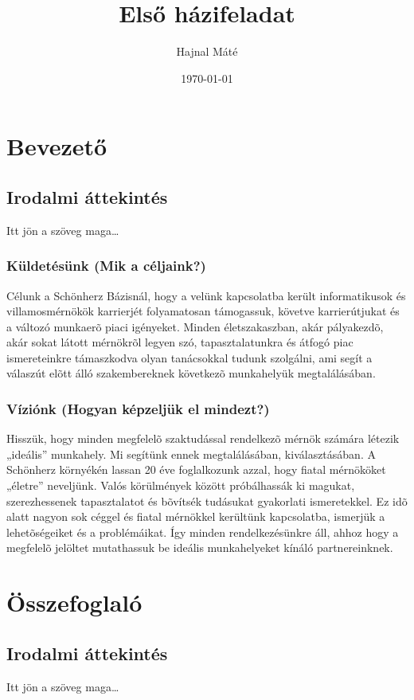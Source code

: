 \documentclass[12pt,a4paper]{report}	%
\begin{document}
\title{Első házifeladat}
\author{Hajnal Máté}
\date{\today}

\maketitle

\tableofcontents\vfill
{}

\chapter{Bevezető}
\section{Irodalmi áttekintés}
Itt jön a szöveg maga\dots

\subsection{Küldetésünk (Mik a céljaink?)}
Célunk a Schönherz Bázisnál, hogy a velünk kapcsolatba került informatikusok és villamosmérnökök karrierjét folyamatosan támogassuk, követve karrierútjukat és a változó munkaerõ piaci igényeket. Minden életszakaszban, akár pályakezdõ, akár sokat látott mérnökrõl legyen szó, tapasztalatunkra és átfogó piac ismereteinkre támaszkodva olyan tanácsokkal tudunk szolgálni, ami segít a válaszút elõtt álló szakembereknek következõ munkahelyük megtalálásában.
\pagebreak
\subsection{Víziónk (Hogyan képzeljük el mindezt?)}
Hisszük, hogy minden megfelelõ szaktudással rendelkezõ mérnök számára létezik „ideális” munkahely. Mi segítünk ennek megtalálásában, kiválasztásában. A Schönherz környékén lassan 20 éve foglalkozunk azzal, hogy fiatal mérnököket „életre” neveljünk. Valós körülmények között próbálhassák ki magukat, sze\-rezhessenek tapasztalatot és bõvítsék tudásukat gyakorlati ismeretekkel. Ez idõ alatt nagyon sok céggel és fiatal mérnökkel kerültünk kapcsolatba, ismerjük a lehetõségeiket és a problémáikat. Így minden rendelkezésünkre áll, ahhoz hogy a megfelelõ jelöltet mutathassuk be ideális munkahelyeket kínáló partnereinknek.

\newpage
\chapter{Összefoglaló}
\section{Irodalmi áttekintés}
Itt jön a szöveg maga\dots
\end{document}
